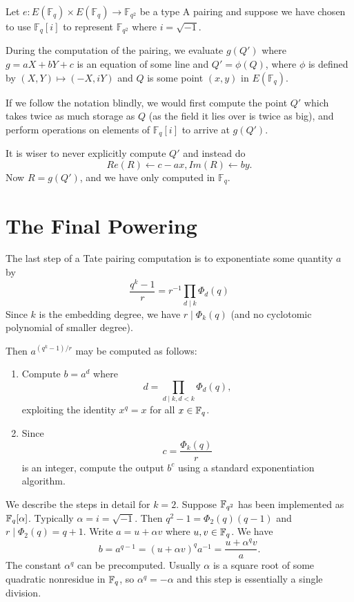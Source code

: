 Let $e : E(\mathbb{F}_q) \times E(\mathbb{F}_q)
\rightarrow \mathbb{F}_{q^2}$ be a type A pairing 
and suppose we have chosen to
use $\mathbb{F}_q [i]$ to represent $\mathbb{F}_{q^2}$ where $i =\sqrt{-1}$.

During the computation of the pairing,
we evaluate $g(Q')$ where $g = aX + bY + c$ is an equation of some line and
$Q' = \phi(Q)$, where $\phi$ is defined by  $(X,Y) \mapsto (-X, iY)$
and $Q$ is some point $(x,y)$ in $E(\mathbb{F}_q)$.

If we follow the notation blindly, we would first compute the point
$Q'$ which takes twice as much storage as $Q$ (as the field it lies over is
twice as big), and perform operations on elements of $\mathbb{F}_q[i]$ to
arrive at $g(Q')$.

It is wiser to never explicitly compute $Q'$ and instead do
\[ Re(R) \gets c - a x , Im(R) \gets b y .\]
Now $R = g(Q')$, and we have only computed in $\mathbb{F}_q$.

\section {The Final Powering}

The last step of a Tate pairing computation is
to exponentiate some quantity $a$ by
\[ \frac{q^k-1}{r} = r^{-1} \prod_{d\mid k} \Phi_d(q) \]
Since $k$ is the embedding degree, we have $r \mid \Phi_k(q)$ (and no
cyclotomic polynomial of smaller degree).

Then $a^{(q^k-1)/r}$ may be computed as follows:
\begin{enumerate}
\item
Compute $b = a^d $ where
\[ d = \prod_{d\mid k, d<k} \Phi_d(q) , \]
exploiting the identity $x^q = x$ for all $x \in \mathbb{F}_q$.
\item
Since
\[ c = \frac{\Phi_k(q)}{r} \]
is an integer, compute the output $b^c$
using a standard exponentiation algorithm.
\end{enumerate}

We describe the steps in detail
for $k = 2$. Suppose $\mathbb{F}_{q^2}$ has been implemented
as $\mathbb{F}_q[\alpha]$. Typically $\alpha = i = \sqrt{-1}$.
Then $q^2 - 1 = \Phi_2(q)(q-1)$ and
$r \mid \Phi_2(q) = q + 1$. Write $a = u + \alpha v$ where $u,v \in \mathbb{F}_q$.
We have
\[ b = a^{q-1} = (u + \alpha v)^q a^{-1} = \frac{u + \alpha^q v}{a} .\]
The constant $\alpha^q$ can be precomputed. Usually $\alpha$ is a square root
of some quadratic nonresidue in $\mathbb{F}_q$, so $\alpha^q = -\alpha$ and
this step is essentially a single division.

